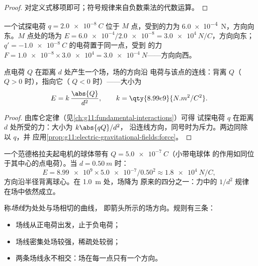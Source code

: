 \begin{proof}
对定义式移项即可；符号规律来自负数乘法的代数运算。
\end{proof}

\begin{example}[读取场]\label{ex:g11:electric-gravitational-fields:reading}
一个试探电荷 $q = \qty{+2.0e-8}{C}$ 位于 $M$ 点，受到的力为
\qty{6.0e-4}{N}，方向向东。$M$ 点处的场为
$E = \num{6.0e-4} / \num{2.0e-8} = \qty{3.0e4}{N/C}$，方向向东；
$q' = \qty{-1.0e-8}{C}$ 的电荷置于同一点，受到
的力 $F = \num{1.0e-8} \times \num{3.0e4} = \qty{3.0e-4}{N}$——方向向西。
\end{example}

\begin{proposition}[点电荷的场]\label{prop:g11:electric-gravitational-fields:point}
点电荷 $Q$ 在距离 $d$ 处产生一个场，场的方向沿
电荷与该点的连线：背离 $Q$（$Q > 0$ 时），指向它（
$Q < 0$ 时）——大小为
\[
E = k\,\frac{\abs{Q}}{d^2},
\qquad k = \qty{8.99e9}{N.m^2/C^2}.
\]
\end{proposition}

\begin{proof}
由库仑定律（见\cref{ch:g11:fundamental-interactions}）可得
试探电荷 $q$ 在距离 $d$ 处所受的力：大小为 $k \abs{qQ} / d^2$，
沿连线方向，同号时为斥力。两边同除以 $q$，并
应用\cref{prop:g11:electric-gravitational-fields:force}。
\end{proof}

\begin{example}[带电球体]\label{ex:g11:electric-gravitational-fields:sphere}
一个范德格拉夫起电机的球体带有 $Q = \qty{+5.0e-7}{C}$（小带电球体
的作用如同位于其中心的点电荷）。当 $d = \qty{0.50}{m}$ 时：
\[
E = \num{8.99e9} \times \num{5.0e-7} / 0.50^2 \approx \qty{1.8e4}{N/C},
\]
方向沿半径背离球心。在 \qty{1.0}{m} 处，场降为
原来的四分之一：力中的 $1/d^2$ 规律在场中依然成立。
\end{example}

\begin{definition}[场线]\label{def:g11:electric-gravitational-fields:lines}
称\emph{场线}为处处与场相切的曲线，
即箭头所示的场方向。规则有三条：
\begin{itemize}
  \item 场线从正电荷出发，止于负电荷；
  \item 场线密集处场较强，稀疏处较弱；
  \item 两条场线永不相交：场在每一点只有一个方向。
\end{itemize}
\end{definition}

